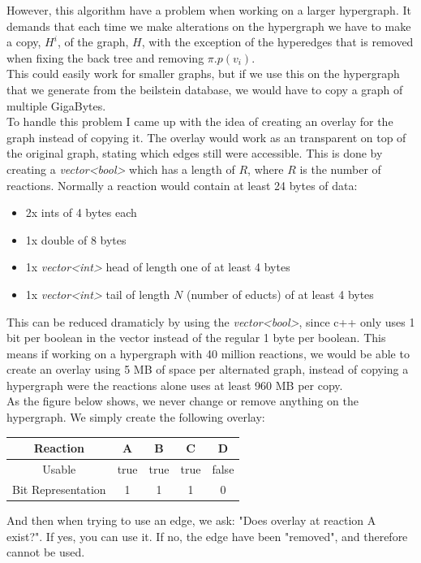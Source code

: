 \documentclass[a4paper,10pt,titlepage]{paper}
\begin{document}
However, this algorithm have a problem when working on a larger hypergraph. It demands that each time we make alterations on the hypergraph we have to make a copy, $H^i$, of the graph, $H$, with the exception of the hyperedges that is removed when fixing the back tree and removing $\pi.p(v_i)$.\\
This could easily work for smaller graphs, but if we use this on the hypergraph that we generate from the beilstein database, we would have to copy a graph of multiple GigaBytes. \\
To handle this problem I came up with the idea of creating an overlay for the graph instead of copying it. The overlay would work as an transparent on top of the original graph, stating which edges still were accessible. This is done by creating a \textit{vector<bool>} which has a length of $R$, where $R$ is the number of reactions. Normally a reaction would contain at least 24 bytes of data:
\begin{itemize}
\item
2x ints of 4 bytes each
\item
1x double of 8 bytes
\item
1x \textit{vector<int>} head of length one of at least 4 bytes
\item
1x \textit{vector<int>} tail of length $N$ (number of educts) of at least 4 bytes
\end{itemize}
This can be reduced dramaticly by using the \textit{vector<bool>}, since c++ only uses 1 bit per boolean in the vector instead of the regular 1 byte per boolean.\cite{VectorBool} This means if working on a hypergraph with 40 million reactions, we would be able to create an overlay using 5 MB of space per alternated graph, instead of copying a hypergraph were the reactions alone uses at least 960 MB per copy. \\
As the figure below shows, we never change or remove anything on the hypergraph. We simply create the following overlay:
\begin{table}[H]
\centering
\begin{tabular}{c|c|c|c|c}
Reaction & A & B & C & D \\\hline
Usable & true & true & true & false \\\hline
Bit Representation & 1 & 1 & 1 & 0
\end{tabular}
\end{table} 
And then when trying to use an edge, we ask: "Does overlay at reaction A exist?". If yes, you can use it. If no, the edge have been "removed", and therefore cannot be used.
\end{document}
